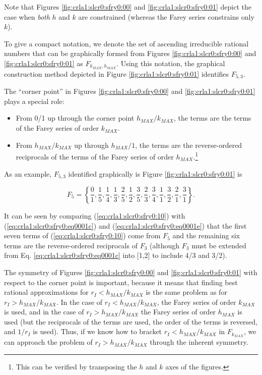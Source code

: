 Note that Figures \ref{fig:crla1:slcr0:sfry0:00}
and \ref{fig:crla1:slcr0:sfry0:01} depict the case when
\emph{both} $h$ and $k$ are constrained (whereas the Farey series
constrains only $k$).

To give a compact notation, we denote the set of ascending irreducible
rational numbers that can be graphically formed
from Figures \ref{fig:crla1:slcr0:sfry0:00}
and \ref{fig:crla1:slcr0:sfry0:01} as  
$F_{k_{MAX}, h_{MAX}}$.  Using this notation, the graphical construction method
depicted in Figure \ref{fig:crla1:slcr0:sfry0:01} identifies $F_{5,3}$.

The ``corner point'' in Figures \ref{fig:crla1:slcr0:sfry0:00}
and \ref{fig:crla1:slcr0:sfry0:01} plays a special role:

\begin{itemize}
\item From 0/1 up through the corner point $h_{MAX}/k_{MAX}$,
      the terms are the terms of the Farey series of order
      $k_{MAX}$.
\item From $h_{MAX}/k_{MAX}$ up through $h_{MAX}/1$, the terms
      are the reverse-ordered reciprocals of the terms of the
      Farey series of order $h_{MAX}$.\footnote{This can be verified
      by transposing the $h$ and $k$ axes of the figures.}
\end{itemize}

As an example, $F_{5,3}$ identified graphically
is Figure \ref{fig:crla1:slcr0:sfry0:01} is

\begin{equation}
\label{eq:crla1:slcr0:sfry0:10}
F_5  = \left\{ {\frac{0}{1},\frac{1}{5},\frac{1}{4},
                \frac{1}{3},\frac{2}{5},\frac{1}{2},
                \frac{3}{5},\frac{2}{3},\frac{3}{4},
                \frac{1}{1},\frac{3}{2}, \frac{2}{1},
                \frac{3}{1} } \right\} .
\end{equation}

It can be seen by comparing (\ref{eq:crla1:slcr0:sfry0:10})
with (\ref{eq:crla1:slcr0:sfry0:eq0001c}) and 
(\ref{eq:crla1:slcr0:sfry0:eq0001e}) that the first seven terms of
(\ref{eq:crla1:slcr0:sfry0:10}) come from $F_5$ and the remaining
six terms are the reverse-ordered reciprocals of $F_3$ (although $F_3$
must be extended from Eq. \ref{eq:crla1:slcr0:sfry0:eq0001c}
into [1,2] to include 4/3 and 3/2).

The symmetry of Figures \ref{fig:crla1:slcr0:sfry0:00} and 
\ref{fig:crla1:slcr0:sfry0:01} with respect to the corner point
is important, because it means that finding best 
rational approximations for 
$r_I < h_{MAX}/k_{MAX}$ is the same problem as for 
$r_I > h_{MAX}/k_{MAX}$.  In the case of
$r_I < h_{MAX}/k_{MAX}$, the Farey series of order
$k_{MAX}$ is used, and in the case of
$r_I > h_{MAX}/k_{MAX}$ the Farey series of order
$h_{MAX}$ is used (but the reciprocals of the terms are
used, the order of the terms is reversed, and $1/r_I$ is used).  Thus, if we
know how to bracket $r_I < h_{MAX}/k_{MAX}$
in $F_{k_{MAX}}$, we can approach
the problem of $r_I > h_{MAX}/k_{MAX}$
through the inherent symmetry.


